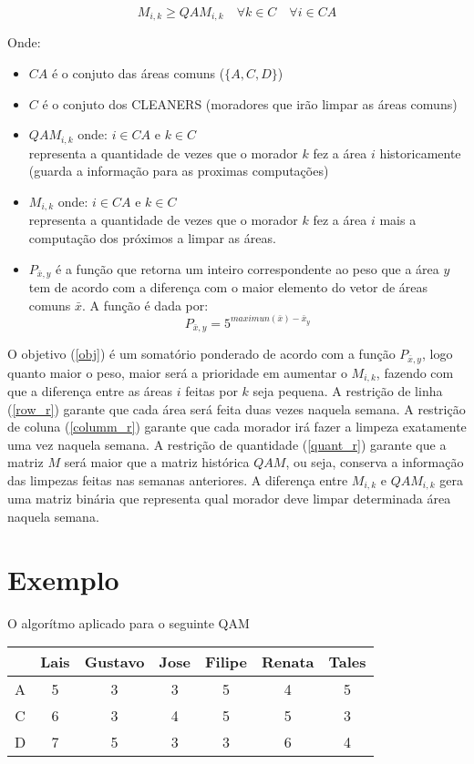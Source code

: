 \documentclass{article}
\begin{document}
	\begin{equation} \label{quant_r}
		M_{i,k} \geq QAM_{i,k} \quad \forall k \in C \quad \forall i \in CA
	\end{equation}

	Onde:
	\begin{itemize}
		\item $CA$ é o conjuto das áreas comuns ($\{A, C, D\}$)
		\item $C$ é o conjuto dos CLEANERS (moradores que irão limpar as áreas comuns)
		\item $QAM_{i,k}$ onde: $i \in CA$ e $k \in C$ \\
			  representa a quantidade de vezes que o morador $k$ fez a área $i$
			  historicamente (guarda a informação para as proximas computações)
		\item $M_{i,k}$ onde: $i \in CA$ e $k \in C$ \\
			  representa a quantidade de vezes que o morador $k$ fez a área $i$
			  mais a computação dos próximos a limpar as áreas.
		\item $P_{\bar{x},y}$ é a função que retorna um inteiro correspondente ao peso
			  que a área $y$ tem de acordo com a diferença com o maior elemento
			  do vetor de áreas comuns $\bar{x}$. A função é dada por:
			  $$P_{\bar{x},y} = 5^{maximun(\bar{x}) - \bar{x}_y}$$
	\end{itemize}
	O objetivo (\ref{obj}) é um somatório ponderado de acordo com a função
	$P_{\bar{x},y}$, logo quanto maior o peso, maior será a prioridade em
	aumentar o $M_{i,k}$, fazendo com que a diferença entre as áreas $i$ feitas
	por $k$ seja pequena. A restrição de linha (\ref{row_r}) garante
	que cada área será feita duas vezes naquela semana. A restrição de coluna
	(\ref{columm_r}) garante que cada morador irá fazer a limpeza exatamente
	uma vez naquela semana. A restrição de quantidade (\ref{quant_r}) garante
	que a matriz $M$ será maior que a matriz histórica $QAM$, ou seja, conserva
	a informação das limpezas feitas nas semanas anteriores. A diferença entre
	$M_{i,k}$ e $QAM_{i,k}$ gera uma matriz binária que representa qual morador
	deve limpar determinada área naquela semana.

	\section{Exemplo}
	O algorítmo aplicado para o seguinte QAM \\

	\begin{tabular}{c|cccccc}
		&	Lais &	Gustavo &	Jose &	Filipe &	Renata &	Tales \\ \hline
		A &	5	 &  3 		&	3	 & 	5      &  	4	   &	5 \\
		C &	6	 &  3 		&	4	 & 	5      &  	5	   &	3 \\
		D &	7	 &  5 		&	3	 & 	3      &  	6	   &	4 \\
	\end{tabular}
	\vspace{1cm}
\end{document}
